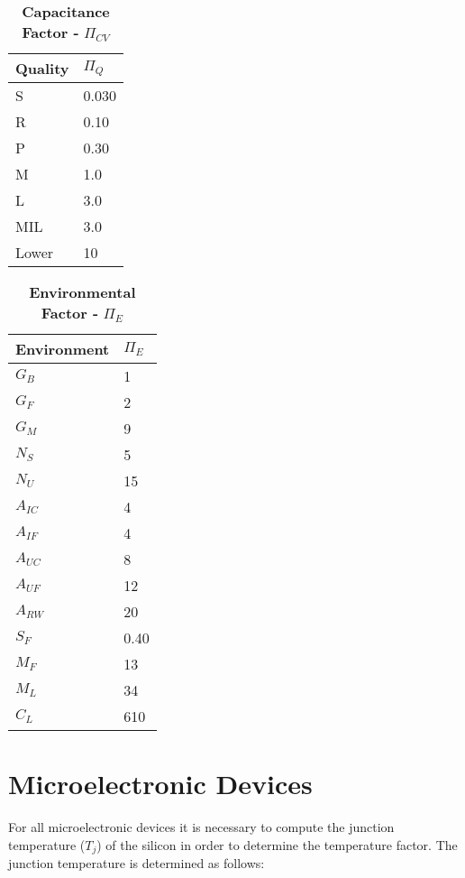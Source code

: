 \begin{table}
\caption{\textbf{Capacitance Factor -} $\Pi_{CV}$}
\label{table:capacitanceFactor}
\begin{tabular}{|l|m{10cm}|} \hline
\textbf{Quality} & $\Pi_{Q}$ \\ \hline
S & 0.030 \\ \hline
R & 0.10 \\ \hline
P & 0.30 \\ \hline
M & 1.0 \\ \hline
L & 3.0 \\ \hline
MIL & 3.0 \\ \hline
Lower & 10 \\ \hline
\end{tabular}
\end{table}

\begin{table}
\caption{\textbf{Environmental Factor -} $\Pi_{E}$}
\label{table:capacitanceFactor}
\begin{tabular}{|l|m{10cm}|} \hline
\textbf{Environment} & $\Pi_{E}$ \\ \hline
$G_{B}$ & 1 \\ \hline
$G_{F}$ & 2 \\ \hline
$G_{M}$ & 9 \\ \hline
$N_{S}$ & 5 \\ \hline
$N_{U}$ & 15 \\ \hline
$A_{IC}$ & 4 \\ \hline
$A_{IF}$ & 4 \\ \hline
$A_{UC}$ & 8 \\ \hline
$A_{UF}$ & 12 \\ \hline
$A_{RW}$ & 20 \\ \hline
$S_{F}$ & 0.40 \\ \hline
$M_{F}$ & 13 \\ \hline
$M_{L}$ & 34 \\ \hline
$C_{L}$ & 610 \\ \hline
\end{tabular}
\end{table}


\section{Microelectronic Devices}
\label{section:microelectronic-devices}

For all microelectronic devices it is necessary to compute the junction
temperature ($T_{j}$) of the silicon in order to determine the temperature 
factor. The junction temperature is determined as follows:

